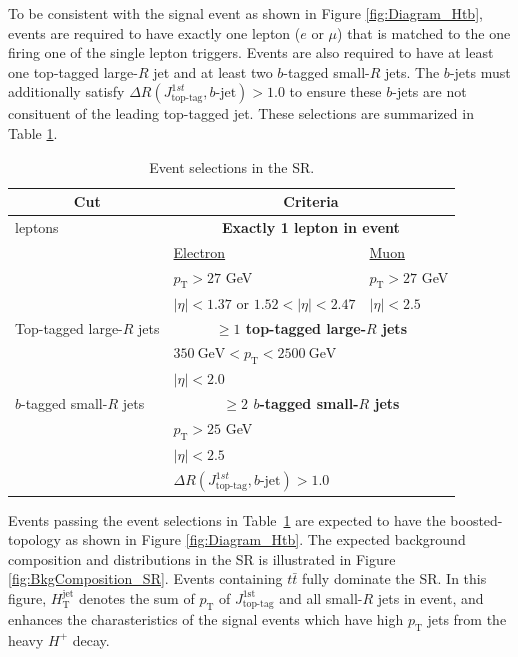 To be consistent with the signal event as shown in Figure \ref{fig:Diagram_Htb}, events are required to have exactly one lepton ($e$ or ${\mu}$) that is matched to the one firing one of the single lepton triggers. Events are also required to have at least one top-tagged large-$R$ jet and at least two $b$-tagged small-$R$ jets. The $b$-jets must additionally satisfy ${\Delta}R(J_{\text{top-tag}}^{1st}, b\text{-jet})>1.0$ to ensure these $b$-jets are not consituent of the leading top-tagged jet.  These selections are summarized in Table \ref{tab:EventSelectionInSR}. 

\begin{table}[H]
  \centering
  \begin{tabular*}{150mm}{lll}
    \hline\hline
    \multicolumn{1}{c}{Cut} & \multicolumn{2}{c}{Criteria}\\
    \hline
    leptons                   & \multicolumn{2}{c}{\textbf{Exactly 1 lepton in event}}\\
                              & \underline{Electron}                & \underline{Muon}\\
                              & $p_{\text{T}}>27$ GeV               & $p_{\text{T}}>27$ GeV\\
                              & $|\eta|<1.37$ or $1.52<|\eta|<2.47$ & $|\eta|<2.5$\\
    \hline
    Top-tagged large-$R$ jets & \multicolumn{2}{c}{\textbf{${\geq}1$ top-tagged large-$R$ jets}}\\
                              & \multicolumn{2}{l}{$350~\text{GeV}<p_{\text{T}}<2500~\text{GeV}$}\\
                              & \multicolumn{2}{l}{$|\eta|<2.0$}\\
    \hline
    $b$-tagged small-$R$ jets & \multicolumn{2}{c}{\textbf{${\geq}2$ $b$-tagged small-$R$ jets}}\\
                              & \multicolumn{2}{l}{$p_{\text{T}}>25$ GeV}\\
                              & \multicolumn{2}{l}{$|\eta|<2.5$}\\
                              & \multicolumn{2}{l}{${\Delta}R(J_{\text{top-tag}}^{1st}, b\text{-jet})>1.0$}\\
    \hline\hline
  \end{tabular*}
  \caption{Event selections in the SR.}
  \label{tab:EventSelectionInSR}
\end{table}

Events passing the event selections in Table~\ref{tab:EventSelectionInSR} are expected to have the boosted-topology as shown in Figure \ref{fig:Diagram_Htb}.
The expected background composition and distributions in the SR is illustrated in Figure \ref{fig:BkgComposition_SR}. Events containing $t\bar{t}$ fully dominate the SR.
In this figure, $H_\text{T}^\text{jet}$ denotes the sum of $p_{\text{T}}$ of $J_\text{top-tag}^\text{1st}$ and all small-$R$ jets in event, and enhances the charasteristics of the signal events which have high $p_\text{T}$ jets from the heavy $H^+$ decay.

